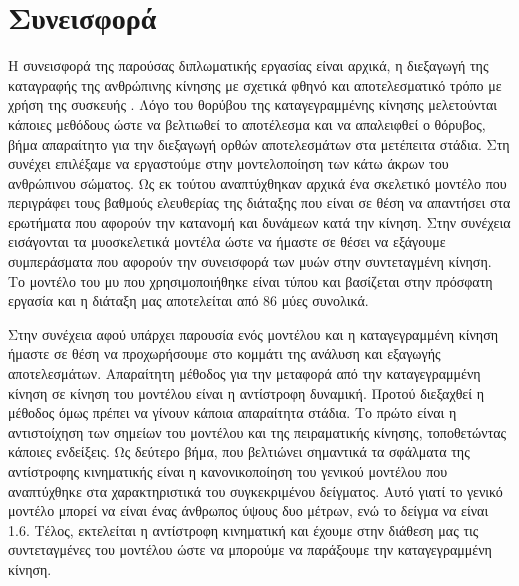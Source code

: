 \section{Συνεισφορά}

Η συνεισφορά της παρούσας διπλωματικής εργασίας είναι αρχικά, η διεξαγωγή της καταγραφής της ανθρώπινης κίνησης με σχετικά φθηνό και αποτελεσματικό τρόπο με χρήση της συσκευής . Λόγο του θορύβου της καταγεγραμμένης κίνησης μελετούνται κάποιες μεθόδους ώστε να βελτιωθεί το αποτέλεσμα και να απαλειφθεί ο θόρυβος, βήμα απαραίτητο για την διεξαγωγή ορθών αποτελεσμάτων στα μετέπειτα στάδια. Στη συνέχει επιλέξαμε να εργαστούμε στην μοντελοποίηση των κάτω άκρων του ανθρώπινου σώματος. Ως εκ τούτου αναπτύχθηκαν αρχικά ένα σκελετικό μοντέλο που περιγράφει τους βαθμούς ελευθερίας της διάταξης που είναι σε θέση να απαντήσει στα ερωτήματα που αφορούν την κατανομή και δυνάμεων κατά την κίνηση. Στην συνέχεια εισάγονται τα μυοσκελετικά μοντέλα ώστε να ήμαστε σε θέσει να εξάγουμε συμπεράσματα που αφορούν την συνεισφορά των μυών στην συντεταγμένη κίνηση. Το μοντέλο του μυ που χρησιμοποιήθηκε είναι τύπου  και βασίζεται στην πρόσφατη εργασία \cite{millard13} και η διάταξη μας αποτελείται από 86 μύες συνολικά.

Στην συνέχεια αφού υπάρχει παρουσία ενός μοντέλου και η καταγεγραμμένη κίνηση ήμαστε σε θέση να προχωρήσουμε στο κομμάτι της ανάλυση και εξαγωγής αποτελεσμάτων. Απαραίτητη μέθοδος για την μεταφορά από την καταγεγραμμένη κίνηση σε κίνηση του μοντέλου είναι η αντίστροφη δυναμική. Προτού διεξαχθεί η μέθοδος όμως πρέπει να γίνουν κάποια απαραίτητα στάδια. Το πρώτο είναι η αντιστοίχηση των σημείων του μοντέλου και της πειραματικής κίνησης, τοποθετώντας κάποιες ενδείξεις. Ως δεύτερο βήμα, που βελτιώνει σημαντικά τα σφάλματα της αντίστροφης κινηματικής είναι η κανονικοποίηση του γενικού μοντέλου που αναπτύχθηκε στα χαρακτηριστικά του συγκεκριμένου δείγματος. Αυτό γιατί το γενικό μοντέλο μπορεί να είναι ένας άνθρωπος ύψους δυο μέτρων, ενώ το δείγμα να είναι 1.6. Τέλος, εκτελείται η αντίστροφη κινηματική και έχουμε στην διάθεση μας τις συντεταγμένες του μοντέλου ώστε να μπορούμε να παράξουμε την καταγεγραμμένη κίνηση.

